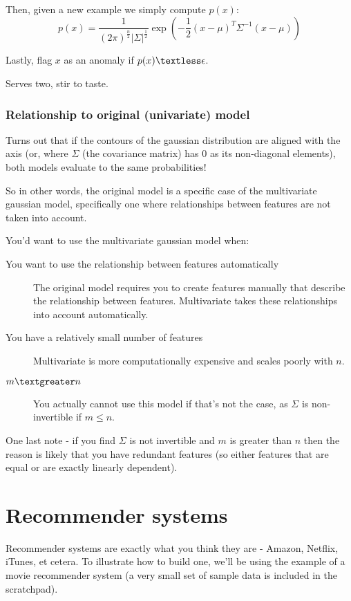 Then, given a new example we simply compute $p(x)$:
\[
p(x) = 
\frac{1}{(2\pi)^{\frac{n}{2}} |\Sigma|^{\frac{1}{2}} }
\exp{\left(
-\frac{1}{2}(x - \mu)^T \Sigma^{-1}(x-\mu)
\right)}
\]

Lastly, flag $x$ as an anomaly if $p(x) \textless \epsilon$.

Serves two, stir to taste.

\subsection{Relationship to original (univariate) model}

Turns out that if the contours of the gaussian distribution are aligned with the axis (or, where $\Sigma$ (the covariance matrix) has 0 as its non-diagonal elements), both models evaluate to the same probabilities!

So in other words, the original model is a specific case of the multivariate gaussian model, specifically one where relationships between features are not taken into account.

You'd want to use the multivariate gaussian model when:
\begin{description}
\item[You want to use the relationship between features automatically] The original model requires you to create features manually that describe the relationship between features. Multivariate takes these relationships into account automatically.
\item[You have a relatively small number of features] Multivariate is more computationally expensive and scales poorly with $n$.
\item[$m \textgreater n$] You actually cannot use this model if that's not the case, as $\Sigma$ is non-invertible if $m \leq n$.
\end{description}

One last note - if you find $\Sigma$ is not invertible and $m$ is greater than $n$ then the reason is likely that  you have redundant features (so either features that are equal or are exactly linearly dependent).

\chapter{Recommender systems}

Recommender systems are exactly what you think they are - Amazon, Netflix, iTunes, et cetera. To illustrate how to build one, we'll be using the example of a movie recommender system (a very small set of sample data is included in the scratchpad).


